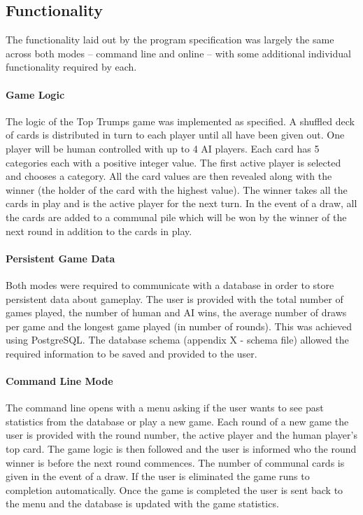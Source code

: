 \newpage
\subsection{Functionality}
The functionality laid out by the program specification was largely the same across both modes -- command line and online -- with some additional individual functionality required by each.

\paragraph{Game Logic}
The logic of the Top Trumps game was implemented as specified. A shuffled deck of cards is distributed in turn to each player until all have been given out. One player will be human controlled with up to 4 AI players. Each card has 5 categories each with a positive integer value. The first active player is selected and chooses a category. All the card values are then revealed along with the winner (the holder of the card with the highest value). The winner takes all the cards in play and is the active player for the next turn. In the event of a draw, all the cards are added to a communal pile which will be won by the winner of the next round in addition to the cards in play.

\paragraph{Persistent Game Data}
Both modes were required to communicate with a database in order to store persistent data about gameplay. The user is provided with the total number of games played, the number of human and AI wins, the average number of draws per game and the longest game played (in number of rounds). This was achieved using PostgreSQL. The database schema (appendix X - schema file) allowed the required information to be saved and provided to the user. 

\paragraph{Command Line Mode}
The command line opens with a menu asking if the user wants to see past statistics from the database or play a new game. Each round of a new game the user is provided with the round number, the active player and the human player's top card. The game logic is then followed and the user is informed who the round winner is before the next round commences. The number of communal cards is given in the event of a draw. If the user is eliminated the game runs to completion automatically. Once the game is completed the user is sent back to the menu and the database is updated with the game statistics. \\

